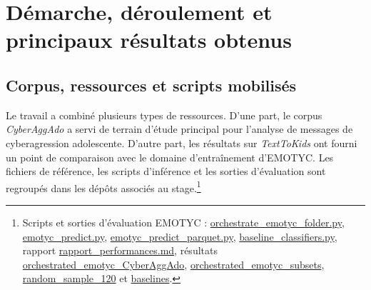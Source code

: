 \section*{Démarche, déroulement et principaux résultats obtenus}

\subsection{Corpus, ressources et scripts mobilisés}

Le travail a combiné plusieurs types de ressources. D'une part, le corpus \textit{CyberAggAdo} a servi de terrain d'étude principal pour l'analyse de messages de cyberagression adolescente. D'autre part, les résultats sur \textit{TextToKids} ont fourni un point de comparaison avec le domaine d'entraînement d'EMOTYC. Les fichiers de référence, les scripts d'inférence et les sorties d'évaluation sont regroupés dans les dépôts associés au stage.\footnote{Scripts et sorties d'évaluation EMOTYC : \href{https://github.com/GwenTsang/Eval-EMOTYC/blob/main/orchestrate_emotyc_folder.py}{orchestrate\_emotyc\_folder.py}, \href{https://github.com/GwenTsang/Eval-EMOTYC/blob/main/emotyc_predict.py}{emotyc\_predict.py}, \href{https://github.com/GwenTsang/Eval-EMOTYC/blob/main/emotyc_predict_parquet.py}{emotyc\_predict\_parquet.py}, \href{https://github.com/GwenTsang/Eval-EMOTYC/blob/main/baseline_classifiers.py}{baseline\_classifiers.py}, rapport \href{https://github.com/GwenTsang/Eval-EMOTYC/blob/main/results/rapport_performances.md}{rapport\_performances.md}, résultats \href{https://github.com/GwenTsang/Eval-EMOTYC/tree/main/results/orchestrated_emotyc_CyberAggAdo}{orchestrated\_emotyc\_CyberAggAdo}, \href{https://github.com/GwenTsang/Eval-EMOTYC/tree/main/results/orchestrated_emotyc_subsets}{orchestrated\_emotyc\_subsets}, \href{https://github.com/GwenTsang/Eval-EMOTYC/tree/main/results/random_sample_120}{random\_sample\_120} et \href{https://github.com/GwenTsang/Eval-EMOTYC/tree/main/results/baselines}{baselines}.}

